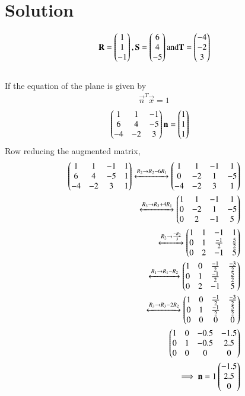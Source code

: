 \documentclass[journal,12pt,twocolumn]{IEEEtran}
\begin{document}
\section{Solution}
\begin{align}
\mathbf{R} = \begin{pmatrix}1\\1\\-1\end{pmatrix},\mathbf{S} = \begin{pmatrix}6\\4\\-5\end{pmatrix} \text{and} \mathbf{T} = \begin{pmatrix}-4\\-2\\3\end{pmatrix}
\end{align}
\\ If the equation of the plane is given by
\begin{align}
\vec{n}^T\vec{x} = 1
\end{align}
\begin{align}
\begin{pmatrix}1&1&-1 \\ 6&4&-5 \\ -4&-2&3\end{pmatrix} \mathbf{n} &= \begin{pmatrix}1\\1\\1\end{pmatrix}
\end{align}
Row reducing the augmented matrix, 
\begin{align}
\begin{pmatrix}1 & 1 & -1 & 1\\6 & 4 & -5 & 1\\-4 & -2 & 3 & 1\end{pmatrix}
\xleftrightarrow {R_2\rightarrow 
R_2-6R_1}\begin{pmatrix}1 & 1 & -1 & 1\\0 & -2 & 1 & -5\\-4 & -2 & 3 & 1\end{pmatrix}
\\
\xleftrightarrow{R_3\rightarrow R_3+4R_1}\begin{pmatrix}1 & 1 & -1 & 1\\0 & -2 & 1 & -5\\0 & 2 & -1 & 5\end{pmatrix}
\\
\xleftrightarrow{R_2\rightarrow\frac{-R_2}{3}}\begin{pmatrix}1 & 1 & -1 & 1\\0 & 1 & \frac{-1}{2} & \frac{5}{2}\\0 & 2 & -1 & 5\end{pmatrix}
\\
\xleftrightarrow{R_1\rightarrow{R_1-R_2}}\begin{pmatrix}1 & 0 & \frac{-1}{2} & \frac{-3}{2}\\0 & 1 & \frac{-1}{2} & \frac{5}{2}\\0 & 2 & -1 & 5\end{pmatrix}
\\
\xleftrightarrow{R_3\rightarrow{R_3-2R_2}}\begin{pmatrix}1 & 0 & \frac{-1}{2} & \frac{-3}{2}\\0 & 1 & \frac{-1}{2} & \frac{5}{2}\\0 & 0 & 0 & 0\end{pmatrix}
\\
\begin{pmatrix}1 & 0 & -0.5 & -1.5\\0 & 1 & -0.5 & 2.5\\0 & 0 & 0 & 0\end{pmatrix}
\\
\implies \mathbf{n} = 1 \begin{pmatrix}-1.5\\2.5\\0\end{pmatrix}
\end{align}
\end{document}
